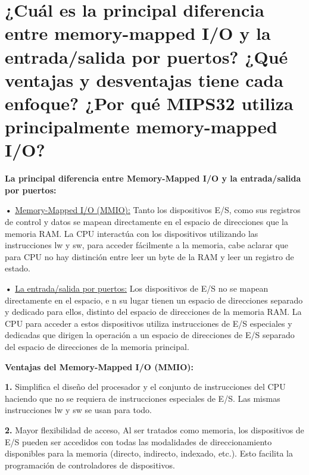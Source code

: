 \documentclass{article}
\begin{document}
\quad
\newpage





\section{¿Cuál es la principal diferencia entre memory-mapped I/O y la entrada/salida por puertos? ¿Qué ventajas y desventajas tiene cada enfoque? ¿Por qué MIPS32 utiliza principalmente memory-mapped I/O?}

\quad

\textbf{La principal diferencia entre Memory-Mapped I/O y la entrada/salida por puertos:}

\quad

\textbf{•   } \underline{Memory-Mapped I/O (MMIO):} {Tanto los dispositivos E/S, como sus registros de control y datos se mapean directamente en el espacio de direcciones que la memoria RAM. La CPU interactúa con los dispositivos utilizando las instrucciones lw y sw, para acceder fácilmente a la memoria, cabe aclarar que para CPU no hay distinción entre leer un byte de la RAM y leer un registro de estado.}

\quad

\textbf{•   } \underline{La entrada/salida por puertos:}{ Los dispositivos de E/S no se mapean directamente en el espacio, e n su lugar tienen un espacio de direcciones separado y dedicado para ellos, distinto del espacio de direcciones de la memoria RAM. La CPU para acceder a estos dispositivos utiliza instrucciones de E/S especiales y dedicadas que dirigen la operación a un espacio de direcciones de E/S separado del espacio de direcciones de la memoria principal. }

\quad


\quad

\textbf{Ventajas del Memory-Mapped I/O (MMIO):}

\quad

\textbf{1.   }{Simplifica el diseño del procesador y el conjunto de instrucciones del CPU haciendo que no se requiera de instrucciones especiales de E/S. Las mismas instrucciones lw y sw se usan para todo.}

\quad

\textbf{2.   }{Mayor flexibilidad de acceso, Al ser tratados como memoria, los dispositivos de E/S pueden ser accedidos con todas las modalidades de direccionamiento disponibles para la memoria (directo, indirecto, indexado, etc.). Esto facilita la programación de controladores de dispositivos.}
\end{document}
